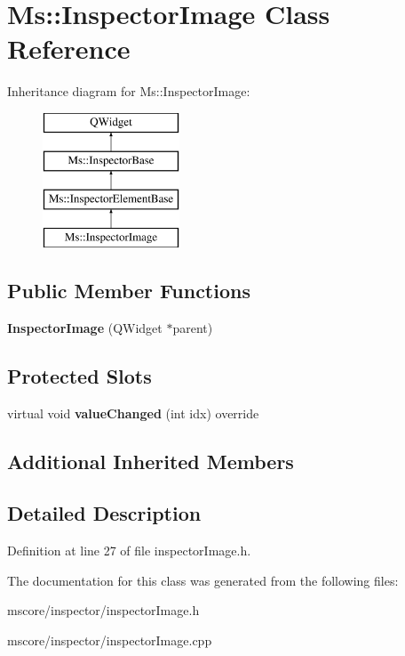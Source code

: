 \hypertarget{class_ms_1_1_inspector_image}{}\section{Ms\+:\+:Inspector\+Image Class Reference}
\label{class_ms_1_1_inspector_image}
Inheritance diagram for Ms\+:\+:Inspector\+Image\+:\begin{figure}[H]
\begin{center}
\leavevmode
\includegraphics[height=4.000000cm]{class_ms_1_1_inspector_image}
\end{center}
\end{figure}
\subsection*{Public Member Functions}
\begin{DoxyCompactItemize}
\item 
\mbox{\label{class_ms_1_1_inspector_image_afe1162bf0bcd62d8db8c05315a7f3d2a}} 
{\bfseries Inspector\+Image} (Q\+Widget $\ast$parent)
\end{DoxyCompactItemize}
\subsection*{Protected Slots}
\begin{DoxyCompactItemize}
\item 
\mbox{\label{class_ms_1_1_inspector_image_aefe542697bb0159e78e7a9e9cdd6c501}} 
virtual void {\bfseries value\+Changed} (int idx) override
\end{DoxyCompactItemize}
\subsection*{Additional Inherited Members}


\subsection{Detailed Description}


Definition at line 27 of file inspector\+Image.\+h.



The documentation for this class was generated from the following files\+:\begin{DoxyCompactItemize}
\item 
mscore/inspector/inspector\+Image.\+h\item 
mscore/inspector/inspector\+Image.\+cpp\end{DoxyCompactItemize}
